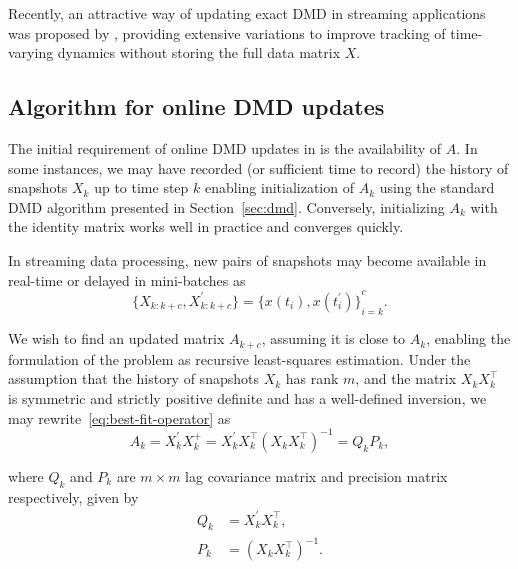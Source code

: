 Recently, an attractive way of updating exact DMD in streaming applications was proposed by \citet{Zhang2019}, providing extensive variations to improve tracking of time-varying dynamics without storing the full data matrix \(X\).

\subsection{Algorithm for online DMD updates}\label{sec:online-dmd-updates}
The initial requirement of online DMD updates in \citet{Zhang2019} is the availability of \(A\). In some instances, we may have recorded (or sufficient time to record) the history of snapshots \(X_k\) up to time step \(k\) enabling initialization of \(A_k\) using the standard DMD algorithm presented in Section~\ref{sec:dmd}. Conversely, initializing \(A_k\) with the identity matrix works well in practice and converges quickly.

In streaming data processing, new pairs of snapshots may become available in real-time or delayed in mini-batches as
\begin{equation}
    \{X_{k : k + c}, X^\prime_{k : k + c}\} = {\{x(t_i), x(t_i^\prime )\}}^c_{i=k}.
\end{equation}

We wish to find an updated matrix \(A_{k+c}\), assuming it is close to \(A_{k}\), enabling the formulation of the problem as recursive least-squares estimation. Under the assumption that the history of snapshots \(X_k\) has rank \(m\), and the matrix \(X_k X_k^\top \) is symmetric and strictly positive definite and has a well-defined inversion, we may rewrite~\eqref{eq:best-fit-operator} as
\begin{equation}\label{eq:pseudo-inverse}
    A_k = X^\prime_k X_k^+ = X^\prime_k X_k^\top {(X_k X_k^\top)}^{-1} = Q_k P_k,
\end{equation}

where \(Q_k\) and \(P_k\) are \(m \times m\) lag covariance matrix and precision matrix respectively, given by
\begin{align}\label{eq:aux-matrices}
    Q_k & = X^\prime_k X_k^\top,   \\
    P_k & = {(X_k X_k^\top)}^{-1}.
\end{align}


